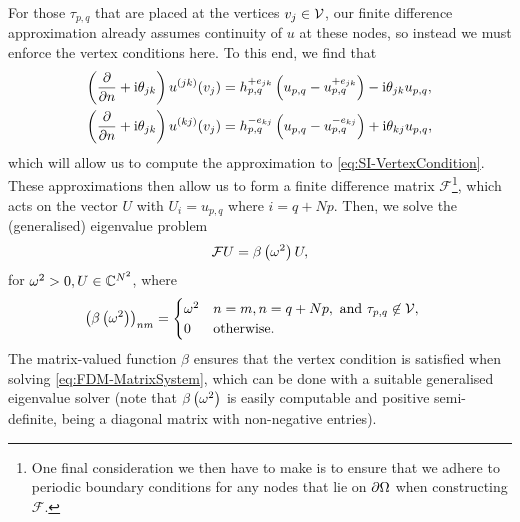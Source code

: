 For those $\tau_{p,q}$ that are placed at the vertices $v_j\in\mathcal{V}$, our finite difference approximation already assumes continuity of $u$ at these nodes, so instead we must enforce the vertex conditions here.
To this end, we find that
\begin{subequations} \label{eq:SI-FDMGeneralVertex}
	\begin{align}
		\left(  \dfrac{\partial }{\partial n} + \mathrm{i}\theta_{jk}  \right) u^{(jk)}(v_j)
		&= h_{p,q}^{+e_{jk}}\left(  u_{p,q} - u_{p,q}^{+e_{jk}}  \right) - \mathrm{i}\theta_{jk}u_{p,q}, \\
		\left(  \dfrac{\partial }{\partial n} + \mathrm{i}\theta_{jk}  \right) u^{(kj)}(v_j)
		&= h_{p,q}^{-e_{kj}}\left(  u_{p,q} - u_{p,q}^{-e_{kj}}  \right) + \mathrm{i}\theta_{kj}u_{p,q},	
	\end{align}
\end{subequations}
which will allow us to compute the approximation to \eqref{eq:SI-VertexCondition}.
These approximations then allow us to form a finite difference matrix $\mathcal{F}$\footnote{One final consideration we then have to make is to ensure that we adhere to periodic boundary conditions for any nodes that lie on $\partial\Omega$ when constructing $\mathcal{F}$.}, which acts on the vector $U$ with $U_{i} = u_{p,q}$ where $i = q + Np$.
Then, we solve the (generalised) eigenvalue problem
\begin{align} \label{eq:FDM-MatrixSystem}
	\mathcal{F}U = \beta\left( \omega^2 \right)U,
\end{align}
for $\omega^2>0, U\in\mathbb{C}^{N^2}$, where 
\begin{align*}
	\left( \beta\left( \omega^2 \right) \right)_{nm} &= 
	\begin{cases}
 		\omega^2 & n=m, n=q + Np, \text{ and } \tau_{p,q}\not\in\mathcal{V}, \\
 		0 & \text{otherwise. }
	\end{cases}
\end{align*}
The matrix-valued function $\beta$ ensures that the vertex condition is satisfied when solving \eqref{eq:FDM-MatrixSystem}, which can be done with a suitable generalised eigenvalue solver (note that $\beta\left( \omega^2 \right)$ is easily computable and positive semi-definite, being a diagonal matrix with non-negative entries).


